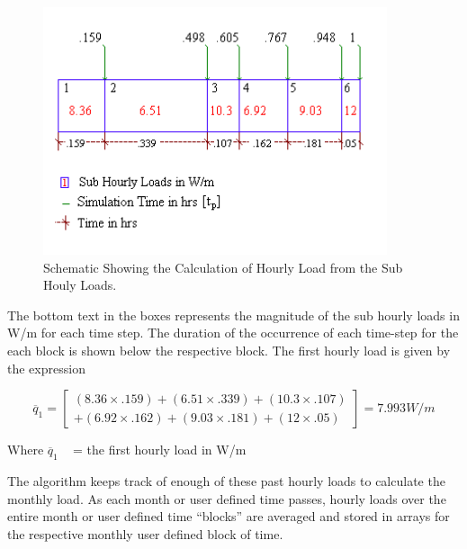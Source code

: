 \begin{figure}[hbtp] %
\centering
\includegraphics[width=0.9\textwidth, height=0.9\textheight, keepaspectratio=true]{media/image5657.png}
\caption{Schematic Showing the Calculation of Hourly Load from the Sub Houly Loads. \protect \label{fig:schematic-showing-the-calculation-of-hourly}}
\end{figure}

The bottom text in the boxes represents the magnitude of the sub hourly loads in W/m for each time step. The duration of the occurrence of each time-step for the each block is shown below the respective block. The first hourly load is given by the expression

\begin{equation}
{\overline q_1} = \left[ \begin{array}{l}\left( {8.36 \times .159} \right) + \left( {6.51 \times .339} \right) + \left( {10.3 \times .107} \right)\\ + \left( {6.92 \times .162} \right) + \left( {9.03 \times .181} \right) + \left( {12 \times .05} \right)\end{array} \right] = 7.993W/m
\end{equation}

Where \({\overline q_1}\) ~ = the first hourly load in W/m

The algorithm keeps track of enough of these past hourly loads to calculate the monthly load. As each month or user defined time passes, hourly loads over the entire month or user defined time ``blocks'' are averaged and stored in arrays for the respective monthly user defined block of time.

